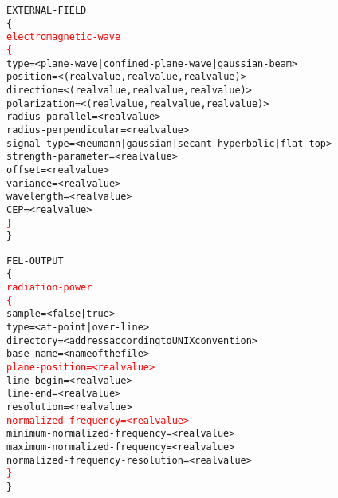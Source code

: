 \documentclass[a4paper]{article}
\begin{document}
\begin{alltt}
EXTERNAL-FIELD
\tabto{0.3cm}\{
\tabto{0.3cm}\textcolor{red}{electromagnetic-wave}
\tabto{0.3cm}\textcolor{red}{\{}
\tabto{0.6cm}type \tabto{6cm} = < plane-wave | confined-plane-wave | gaussian-beam >
\tabto{0.6cm}position \tabto{6cm} = < ( real value , real value , real value ) >
\tabto{0.6cm}direction \tabto{6cm} = < ( real value , real value , real value ) >
\tabto{0.6cm}polarization \tabto{6cm} = < ( real value , real value , real value ) >
\tabto{0.6cm}radius-parallel \tabto{6cm} = < real value >
\tabto{0.6cm}radius-perpendicular \tabto{6cm} = < real value >
\tabto{0.6cm}signal-type \tabto{6cm} = < neumann | gaussian | secant-hyperbolic | flat-top >
\tabto{0.6cm}strength-parameter \tabto{6cm} = < real value >
\tabto{0.6cm}offset \tabto{6cm} = < real value >
\tabto{0.6cm}variance \tabto{6cm} = < real value >
\tabto{0.6cm}wavelength \tabto{6cm} = < real value >
\tabto{0.6cm}CEP \tabto{6cm} = < real value >
\tabto{0.3cm}\textcolor{red}{\}}
\}

FEL-OUTPUT
\{
\tabto{0.3cm}\textcolor{red}{radiation-power}
\tabto{0.3cm}\textcolor{red}{\{}
\tabto{0.6cm}sample \tabto{6cm} = < false | true >
\tabto{0.6cm}type \tabto{6cm} = < at-point | over-line >
\tabto{0.6cm}directory \tabto{6cm} = < address according to UNIX convention >
\tabto{0.6cm}base-name \tabto{6cm} = < name of the file >
\tabto{0.6cm}\textcolor{red}{plane-position \tabto{6cm} = < real value >}
\tabto{0.6cm}line-begin \tabto{6cm} = < real value >
\tabto{0.6cm}line-end \tabto{6cm} = < real value >
\tabto{0.6cm}resolution \tabto{6cm} = < real value >
\tabto{0.6cm}\textcolor{red}{normalized-frequency \tabto{6cm} = < real value >}
\tabto{0.6cm}minimum-normalized-frequency \tabto{8cm} = < real value >
\tabto{0.6cm}maximum-normalized-frequency \tabto{8cm} = < real value >
\tabto{0.6cm}normalized-frequency-resolution \tabto{8cm} = < real value >
\tabto{0.3cm}\textcolor{red}{\}}
\}
\end{alltt}
\end{document}
